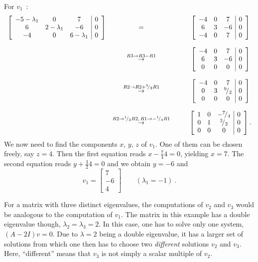 \begin{example}
\begin{enumerate}[(i)]
		For $v_1$~:
		\[\begin{array}{ccc}
		\left[\begin{array}{ccc|c}
		-5-\lambda_1 & 0 & 7 & 0 \\
		 6 & 2-\lambda_1 & -6 & 0\\ 
		 -4 & 0 & 6-\lambda_1 & 0
		\end{array}\right] & = \qquad & \left[\begin{array}{ccc|c}
		-4 & 0 & 7 & 0 \\
		6 & 3 & -6 & 0\\ 
		-4 & 0 & 7 & 0
		\end{array}\right] \\ & & \\
		& \stackrel{R3 \rightarrow R3 - R1}{\rightarrow} \qquad & 
		\left[\begin{array}{ccc|c}
		-4 & 0 & 7 & 0 \\
		6 & 3 & -6 & 0\\ 
		0 & 0 & 0 & 0
		\end{array}\right] \\ & & \\
		& \stackrel{R2 \rightarrow R2 + {}^{3}\!/_{2} R1}{\rightarrow} \qquad & 
		\left[\begin{array}{ccc|c}
		-4 & 0 & 7 & 0 \\
		0 & 3 & {}^{9}\!/_{2} & 0\\ 
		0 & 0 & 0 & 0
		\end{array}\right]
		\\ & & \\
		& \stackrel{R2 \rightarrow {}^{1}\!/_{3} R2, \, R1 \rightarrow -{}^{1}\!/_{4} R1}{\rightarrow} \qquad & 
		\left[\begin{array}{ccc|c}
		1 & 0 & -{}^{7}\!/_{4} & 0 \\
		0 & 1 & {}^{3}\!/_{2} & 0\\ 
		0 & 0 & 0 & 0
		\end{array}\right].
		\end{array}	\]
		We now need to find the components $x$, $y$, $z$ of $v_1$. One of them can be chosen freely, say $z=4$. Then the first equation reads $x-\tfrac744 = 0$, yielding $x=7$. The second equation reads $y+\tfrac324 = 0$ and we obtain $y=-6$ and
		\[v_1 = \begin{bmatrix}
		7 \\ -6 \\ 4
		\end{bmatrix} \qquad (\lambda_1 = -1) \:. \]

		For a matrix with three distinct eigenvalues, the computations of $v_2$ and $v_3$ would be analogous to the computation of $v_1$. The matrix in this example has a double eigenvalue though, $\lambda_2=\lambda_3=2$. In this case, one has to solve only one system, $(A-2 I)v=0$. Due to $\lambda =2$ being a double eigenvalue, it has a larger set of solutions from which one then has to choose two \emph{different} solutions $v_2$ and $v_3$. Here, ``different'' means that $v_3$ is not simply a scalar multiple of $v_2$.
		

\end{enumerate}
\end{example}

